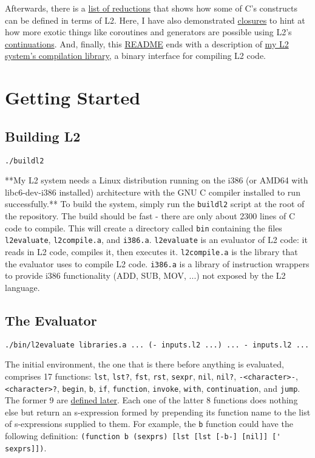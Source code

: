 \documentclass[twocolumn,landscape]{article}
\begin{document}
    Afterwards, there is a \hyperref[sec:examplesreductions]{list of reductions} that shows how some of C's constructs can be defined in terms of L2. Here, I have also demonstrated \hyperref[sec:closures]{closures} to hint at how more exotic things like coroutines and generators are possible using L2's \hyperref[sec:jump]{continuations}. And, finally, this \href{https://github.com/murisi/L2/raw/master/l2.pdf}{README} ends with a description of \hyperref[sec:compilation-library]{my L2 system's compilation library}, a binary interface for compiling L2 code.

  \tableofcontents

  \section{Getting Started}\label{sec:getting-started}
  \subsection{Building L2}\label{sec:building-l2}
  \begin{lstlisting}
./buildl2
  \end{lstlisting}
  **My L2 system needs a Linux distribution running on the i386 (or AMD64 with libc6-dev-i386 installed) architecture with the GNU C compiler installed to run successfully.** To build the system, simply run the \lstinline{buildl2} script at the root of the repository. The build should be fast - there are only about 2300 lines of C code to compile. This will create a directory called \lstinline{bin} containing the files \lstinline{l2evaluate}, \lstinline{l2compile.a}, and \lstinline{i386.a}. \lstinline{l2evaluate} is an evaluator of L2 code: it reads in L2 code, compiles it, then executes it. \lstinline{l2compile.a} is the library that the evaluator uses to compile L2 code. \lstinline{i386.a} is a library of instruction wrappers to provide i386 functionality (ADD, SUB, MOV, ...) not exposed by the L2 language.

  \subsection{The Evaluator}\label{sec:the-evaluator}
    \begin{lstlisting}
./bin/l2evaluate libraries.a ... (- inputs.l2 ...) ... - inputs.l2 ...
    \end{lstlisting}
    The initial environment, the one that is there before anything is evaluated, comprises 17 functions: \lstinline{lst}, \lstinline{lst?}, \lstinline{fst}, \lstinline{rst}, \lstinline{sexpr}, \lstinline{nil}, \lstinline{nil?}, \lstinline{-<character>-}, \lstinline{<character>?}, \lstinline{begin}, \lstinline{b}, \lstinline{if}, \lstinline{function}, \lstinline{invoke}, \lstinline{with}, \lstinline{continuation}, and \lstinline{jump}. The former 9 are \hyperref[sec:internal-representation]{defined later}. Each one of the latter 8 functions does nothing else but return an s-expression formed by prepending its function name to the list of s-expressions supplied to them. For example, the \lstinline{b} function could have the following definition: \lstinline{(function b (sexprs) [lst [lst [-b-] [nil]] [' sexprs]])}.
\end{document}
